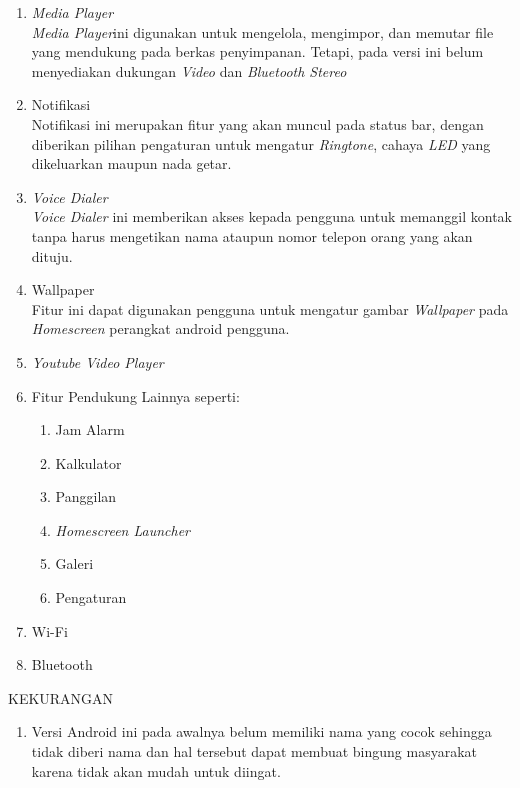 \begin{enumerate}
\begin{enumerate}
\item \textit{Media Player}\\
\textit{Media Player}ini digunakan untuk mengelola, mengimpor, dan memutar file yang mendukung pada berkas penyimpanan. Tetapi, pada versi ini belum menyediakan dukungan \textit{Video} dan \textit{Bluetooth Stereo}
\item Notifikasi\\
Notifikasi ini merupakan fitur yang akan muncul pada status bar, dengan diberikan pilihan pengaturan untuk mengatur \textit{Ringtone}, cahaya \textit{LED} yang dikeluarkan maupun nada getar.
\item \textit{Voice Dialer}\\ 
\textit{Voice Dialer} ini memberikan akses kepada pengguna untuk memanggil kontak tanpa harus mengetikan nama ataupun nomor telepon orang yang akan dituju.
\item Wallpaper\\ 
Fitur ini dapat digunakan pengguna untuk mengatur gambar \textit{Wallpaper} pada \textit{Homescreen} perangkat android pengguna. 
\item \textit{Youtube Video Player}
\item Fitur Pendukung Lainnya seperti:
\begin{enumerate}
    \item Jam Alarm
    \item Kalkulator
    \item Panggilan
    \item \textit{Homescreen Launcher}
    \item Galeri
    \item Pengaturan
\end{enumerate}
\item Wi-Fi
\item Bluetooth
\end{enumerate}

KEKURANGAN
\begin{enumerate}
    \item Versi Android ini pada awalnya belum memiliki nama yang cocok sehingga tidak diberi nama dan hal tersebut dapat membuat bingung masyarakat karena tidak akan mudah untuk diingat.
\end{enumerate}



\end{enumerate}
